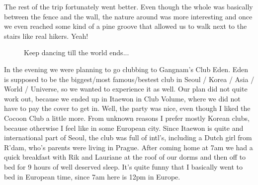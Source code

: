 \begin{post}
\begin{content}
The rest of the trip fortunately went better. Even though the whole was basically between the fence and the wall, the nature around was more interesting and once we even reached some kind of a pine groove that allowed us to walk next to the stairs like real hikers. Yeah!

\begin{figure}[h]
\centering
{}
\end{figure}

\begin{figure}
\centering{}
\caption{Keep dancing till the world ends...}
\vspace{-12pt}
\end{figure}In the evening we were planning to go clubbing to Gangnam's Club Eden. Eden is supposed to be the biggest/most famous/bestest club in Seoul / Korea / Asia / World / Universe, so we wanted to experience it as well. Our plan did not quite work out, because we ended up in Itaewon in Club Volume, where we did not have to pay the cover to get in. Well, the party was nice, even though I liked the Cocoon Club a little more. From unknown reasons I prefer mostly Korean clubs, because otherwise I feel like in some European city. Since Itaewon is quite and international part of Seoul, the club was full of intl's, including a Dutch girl from R'dam, who's parents were living in Prague. After coming home at 7am we had a quick breakfast with Rik and Lauriane at the roof of our dorms and then off to bed for 9 hours of well deserved sleep. It's quite funny that I basically went to bed in European time, since 7am here is 12pm in Europe.

\end{content}
\end{post}
